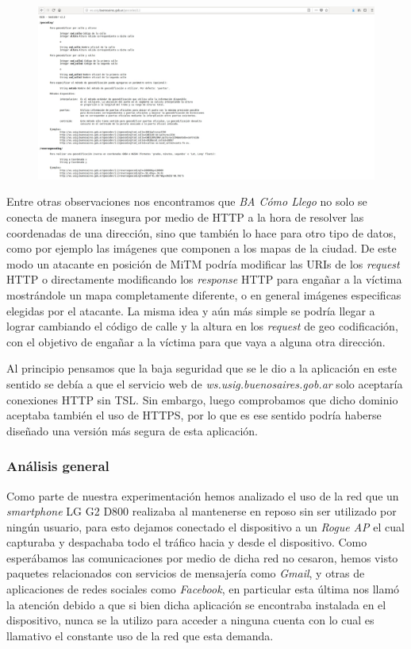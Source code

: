 \documentclass[10pt,a4paper]{article}
\begin{document}
\begin{figure}[H]
\centerline{\includegraphics[scale=0.25]{images/ws_usig_buenosaires_v2.jpg}}
\caption{}
\end{figure}

Entre otras observaciones nos encontramos que \textit{BA Cómo Llego} no solo se conecta de manera insegura por medio de HTTP a la hora de resolver las coordenadas de una dirección, sino que también lo hace para otro tipo de datos, como por ejemplo las imágenes que componen a los mapas de la ciudad. De este modo un atacante en posición de MiTM podría modificar las URIs de los \textit{request} HTTP o directamente modificando los \textit{response} HTTP para engañar a la víctima mostrándole un mapa completamente diferente, o en general imágenes especificas elegidas por el atacante. La misma idea y aún más simple se podría llegar a lograr cambiando el código de calle y la altura en los \textit{request} de geo codificación, con el objetivo de engañar a la víctima para que vaya a alguna otra dirección.

Al principio pensamos que la baja seguridad que se le dio a la aplicación en este sentido se debía a que el servicio web de \textit{ws.usig.buenosaires.gob.ar} solo aceptaría conexiones HTTP sin TSL. Sin embargo, luego comprobamos que dicho dominio aceptaba también el uso de HTTPS, por lo que es ese sentido podría haberse diseñado una versión más segura de esta aplicación.

\subsubsection{Análisis general}

Como parte de nuestra experimentación hemos analizado el uso de la red que un \textit{smartphone} LG G2 D800 realizaba al mantenerse en reposo sin ser utilizado por ningún usuario, para esto dejamos conectado el dispositivo a un \textit{Rogue AP} el cual capturaba y despachaba todo el tráfico hacia y desde el dispositivo. Como esperábamos las comunicaciones por medio de dicha red no cesaron, hemos visto paquetes relacionados con servicios de mensajería como \textit{Gmail}, y otras de aplicaciones de redes sociales como \textit{Facebook}, en particular esta última nos llamó la atención debido a que si bien dicha aplicación se encontraba instalada en el dispositivo, nunca se la utilizo para acceder a ninguna cuenta con lo cual es llamativo el constante uso de la red que esta demanda.
\end{document}
